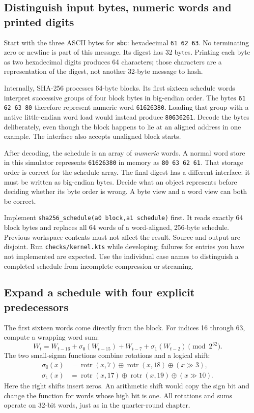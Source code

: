 \subsection*{Distinguish input bytes, numeric words and printed digits}

Start with the three ASCII bytes for \texttt{abc}: hexadecimal
\texttt{61 62 63}. No terminating zero or newline is part of this message.
Its digest has 32 bytes. Printing each byte as two hexadecimal digits produces
64 characters; those characters are a representation of the digest, not another
32-byte message to hash.

Internally, SHA-256 processes 64-byte blocks. Its first sixteen schedule words
interpret successive groups of four block bytes in big-endian order.
The bytes \texttt{61 62 63 80} therefore represent numeric word
\texttt{61626380}. Loading that group with a native little-endian word load
would instead produce \texttt{80636261}. Decode the bytes deliberately, even
though the block happens to lie at an aligned address in one example.
The interface also accepts unaligned block starts.

After decoding, the schedule is an array of \emph{numeric} words. A normal word
store in this simulator represents \texttt{61626380} in memory as
\texttt{80 63 62 61}. That storage order is correct for the schedule array.
The final digest has a different interface: it must be written as big-endian
bytes. Decide what an object represents before deciding whether its byte order
is wrong. A byte view and a word view can both be correct.

Implement \texttt{sha256\_schedule(a0 block,a1 schedule)} first. It reads
exactly 64 block bytes and replaces all 64 words of a word-aligned, 256-byte
schedule. Previous workspace contents must not affect the result. Source and
output are disjoint. Run \texttt{checks/kernel.kts} while developing; failures
for entries you have not implemented are expected. Use the individual case names
to distinguish a completed schedule from incomplete compression or streaming.

\subsection*{Expand a schedule with four explicit predecessors}

The first sixteen words come directly from the block. For indices 16 through
63, compute a wrapping word sum:
\[
  W_t=W_{t-16}+\sigma_0(W_{t-15})+W_{t-7}+\sigma_1(W_{t-2})
  \pmod {2^{32}}.
\]
The two small-sigma functions combine rotations and a logical shift:
\[
  \begin{aligned}
    \sigma_0(x) & =\operatorname{rotr}(x,7)\mathbin{\oplus}
    \operatorname{rotr}(x,18)\mathbin{\oplus}(x\gg3),        \\
    \sigma_1(x) & =\operatorname{rotr}(x,17)\mathbin{\oplus}
    \operatorname{rotr}(x,19)\mathbin{\oplus}(x\gg10).
  \end{aligned}
\]
Here the right shifts insert zeros. An arithmetic shift would copy the sign bit
and change the function for words whose high bit is one. All rotations and sums
operate on 32-bit words, just as in the quarter-round chapter.

